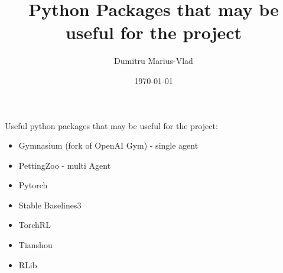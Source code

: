 \documentclass[12pt]{article}
\title{Python Packages that may be useful for the project}
\author{Dumitru Marius-Vlad}
\date{\today}
\begin{document}
\maketitle

Useful python packages that may be useful for the project:
\begin{itemize}
    \item Gymnasium (fork of OpenAI Gym) - single agent
    \item PettingZoo - multi Agent
    \item Pytorch
    \item Stable Baselines3
    \item TorchRL
    \item Tianshou
    \item RLib
\end{itemize}
\end{document}
